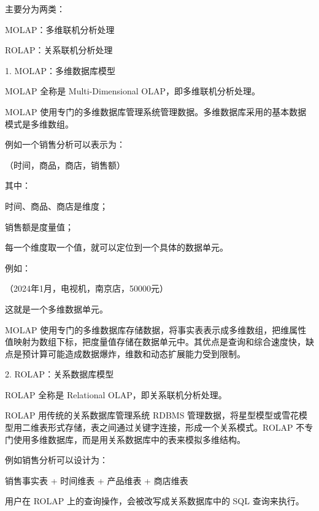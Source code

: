 \documentclass[UTF8,zihao=-4]{ctexart}
\begin{document}
主要分为两类：\par
MOLAP：多维联机分析处理\par
ROLAP：关系联机分析处理\par

1. MOLAP：多维数据库模型\par

MOLAP 全称是 Multi-Dimensional OLAP，即多维联机分析处理。\par
MOLAP 使用专门的多维数据库管理系统管理数据。多维数据库采用的基本数据模式是多维数组。\par

例如一个销售分析可以表示为：\par

（时间，商品，商店，销售额）\par

其中：\par

时间、商品、商店是维度；\par
销售额是度量值；\par
每一个维度取一个值，就可以定位到一个具体的数据单元。\par

例如：\par

（2024年1月，电视机，南京店，50000元）\par

这就是一个多维数据单元。\par

MOLAP 使用专门的多维数据库存储数据，将事实表表示成多维数组，把维属性值映射为数组下标，把度量值存储在数据单元中。其优点是查询和综合速度快，缺点是预计算可能造成数据爆炸，维数和动态扩展能力受到限制。\par

2. ROLAP：关系数据库模型\par

ROLAP 全称是 Relational OLAP，即关系联机分析处理。\par

ROLAP 用传统的关系数据库管理系统 RDBMS 管理数据，将星型模型或雪花模型用二维表形式存储，表之间通过关键字连接，形成一个关系模式。ROLAP 不专门使用多维数据库，而是用关系数据库中的表来模拟多维结构。\par

例如销售分析可以设计为：\par

销售事实表 + 时间维表 + 产品维表 + 商店维表\par

用户在 ROLAP 上的查询操作，会被改写成关系数据库中的 SQL 查询来执行。\par
\end{document}
